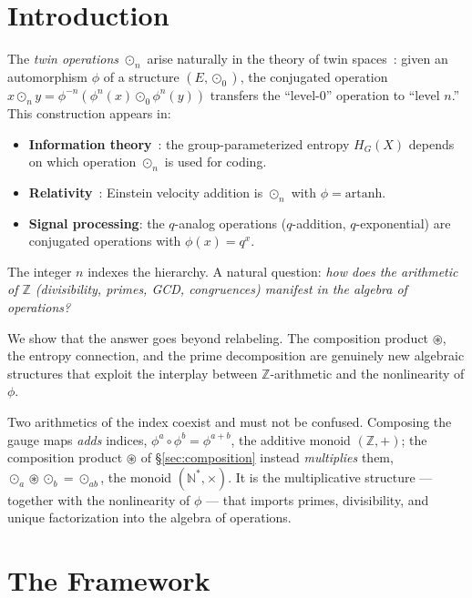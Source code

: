 \documentclass[11pt,twocolumn]{article}
\theoremstyle{plain}
\theoremstyle{definition}
\theoremstyle{remark}
\newcommand{\N}{\mathbb{N}}
\newcommand{\Z}{\mathbb{Z}}
\begin{document}
\section{Introduction}
\label{sec:intro}

The \emph{twin operations} $\odot_n$ arise naturally in the theory of twin spaces~\cite{nembe2026vol1,nembe2026vol3}: given an automorphism $\phi$ of a structure $(E, \odot_0)$, the conjugated operation $x \odot_n y = \phi^{-n}(\phi^n(x) \odot_0 \phi^n(y))$ transfers the ``level-0'' operation to ``level $n$.'' This construction appears in:

\begin{itemize}
    \item \textbf{Information theory}~\cite{nembe2026vol16}: the group-parameterized entropy $H_G(X)$ depends on which operation $\odot_n$ is used for coding.
    \item \textbf{Relativity}~\cite{nembe2026vol17}: Einstein velocity addition is $\odot_n$ with $\phi = \mathrm{artanh}$.
    \item \textbf{Signal processing}: the $q$-analog operations ($q$-addition, $q$-exponential) are conjugated operations with $\phi(x) = q^x$.
\end{itemize}

The integer $n$ indexes the hierarchy. A natural question: \emph{how does the arithmetic of $\Z$ (divisibility, primes, GCD, congruences) manifest in the algebra of operations?}

We show that the answer goes beyond relabeling. The composition product $\circledast$, the entropy connection, and the prime decomposition are genuinely new algebraic structures that exploit the interplay between $\Z$-arithmetic and the nonlinearity of $\phi$.

Two arithmetics of the index coexist and must not be confused. Composing the gauge maps \emph{adds} indices, $\phi^a\circ\phi^b=\phi^{a+b}$, the additive monoid $(\Z,+)$; the composition product $\circledast$ of \S\ref{sec:composition} instead \emph{multiplies} them, $\odot_a\circledast\odot_b=\odot_{ab}$, the monoid $(\N^*,\times)$. It is the multiplicative structure --- together with the nonlinearity of $\phi$ --- that imports primes, divisibility, and unique factorization into the algebra of operations.


\section{The Framework}
\label{sec:framework}
\end{document}
